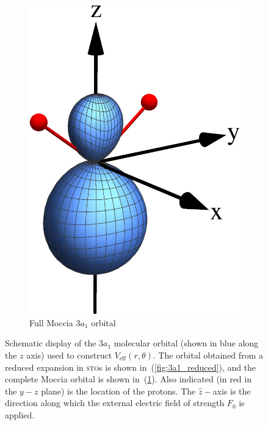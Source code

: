 \begin{figure}
\begin{subfigure}[b]{0.25\linewidth}
    \includegraphics[width=\textwidth]{figures/ch_H2O/3a1/3a1Moccia.eps}
    \caption{Full Moccia $3a_{1}$ orbital}\label{fig:3a1_Moccia}
  \end{subfigure}
  \caption{Schematic display of the $3a_{1}$ molecular orbital (shown
    in blue along the $z$ axis) used to construct
    $V_{\mathrm{eff}}(r,\theta)$. The orbital obtained from a reduced
    expansion in \textsc{sto}s is shown in~(\ref{fig:3a1_reduced}),
    and the complete Moccia orbital is shown
    in~(\ref{fig:3a1_Moccia}). Also indicated (in red in the $y-z$
    plane) is the location of the protons. The $\hat{z}-$axis is the
    direction along which the external electric field of strength
    $F_{0}$ is applied.}
  \label{fig:3a1_prob_density}
\end{figure}

